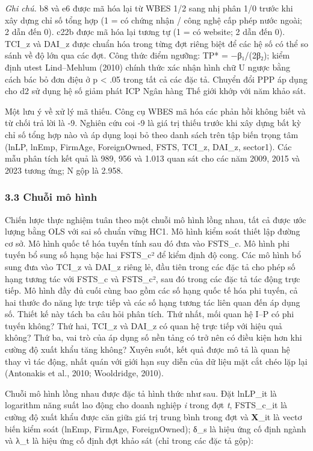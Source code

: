 \documentclass[12pt,a4paper]{article}
\begin{document}
\emph{Ghi chú.} b8 và e6 được mã hóa lại từ WBES 1/2 sang nhị phân 1/0
trước khi xây dựng chỉ số tổng hợp (1 = có chứng nhận / công nghệ cấp
phép nước ngoài; 2 dẫn đến 0). c22b được mã hóa lại tương tự (1 = có
website; 2 dẫn đến 0). TCI\_z và DAI\_z được chuẩn hóa trong từng đợt
riêng biệt để các hệ số có thể so sánh về độ lớn qua các đợt. Công thức
điểm ngưỡng: TP* = −β₁/(2β₂); kiểm định utest Lind--Mehlum (2010) chính
thức xác nhận hình chữ U ngược bằng cách bác bỏ đơn điệu ở p \textless{}
.05 trong tất cả các đặc tả. Chuyển đổi PPP áp dụng cho d2 sử dụng hệ số
giảm phát ICP Ngân hàng Thế giới khớp với năm khảo sát.

Một lưu ý về xử lý mã thiếu. Công cụ WBES mã hóa các phản hồi không biết
và từ chối trả lời là -9. Nghiên cứu coi -9 là giá trị thiếu trước khi
xây dựng bất kỳ chỉ số tổng hợp nào và áp dụng loại bỏ theo danh sách
trên tập biến trọng tâm (lnLP, lnEmp, FirmAge, ForeignOwned, FSTS,
TCI\_z, DAI\_z, sector1). Các mẫu phân tích kết quả là 989, 956 và 1.013
quan sát cho các năm 2009, 2015 và 2023 tương ứng; N gộp là 2.958.

\hypertarget{33-chuux1ed7i-muxf4-huxecnh}{%
\subsubsection{3.3 Chuỗi mô hình}\label{33-chuux1ed7i-muxf4-huxecnh}}

Chiến lược thực nghiệm tuân theo một chuỗi mô hình lồng nhau, tất cả
được ước lượng bằng OLS với sai số chuẩn vững HC1. Mô hình kiểm soát
thiết lập đường cơ sở. Mô hình quốc tế hóa tuyến tính sau đó đưa vào
FSTS\_c. Mô hình phi tuyến bổ sung số hạng bậc hai FSTS\_c² để kiểm định
độ cong. Các mô hình bổ sung đưa vào TCI\_z và DAI\_z riêng lẻ, đầu tiên
trong các đặc tả cho phép số hạng tương tác với FSTS\_c và FSTS\_c², sau
đó trong các đặc tả tác động trực tiếp. Mô hình đầy đủ cuối cùng bao gồm
các số hạng quốc tế hóa phi tuyến, cả hai thước đo năng lực trực tiếp và
các số hạng tương tác liên quan đến áp dụng số. Thiết kế này tách ba câu
hỏi phân tích. Thứ nhất, mối quan hệ I--P có phi tuyến không? Thứ hai,
TCI\_z và DAI\_z có quan hệ trực tiếp với hiệu quả không? Thứ ba, vai
trò của áp dụng số nền tảng có trở nên có điều kiện hơn khi cường độ
xuất khẩu tăng không? Xuyên suốt, kết quả được mô tả là quan hệ thay vì
tác động, nhất quán với giới hạn suy diễn của dữ liệu mặt cắt chéo lặp
lại (Antonakis et al., 2010; Wooldridge, 2010).

Chuỗi mô hình lồng nhau được đặc tả hình thức như sau. Đặt lnLP\_it là
logarithm năng suất lao động cho doanh nghiệp \emph{i} trong đợt
\emph{t}, FSTS\_c\_it là cường độ xuất khẩu được căn giữa giá trị trung
bình trong đợt và \textbf{X}\_it là vectơ biến kiểm soát (lnEmp,
FirmAge, ForeignOwned); δ\_s là hiệu ứng cố định ngành và λ\_t là hiệu
ứng cố định đợt khảo sát (chỉ trong các đặc tả gộp):
\end{document}
